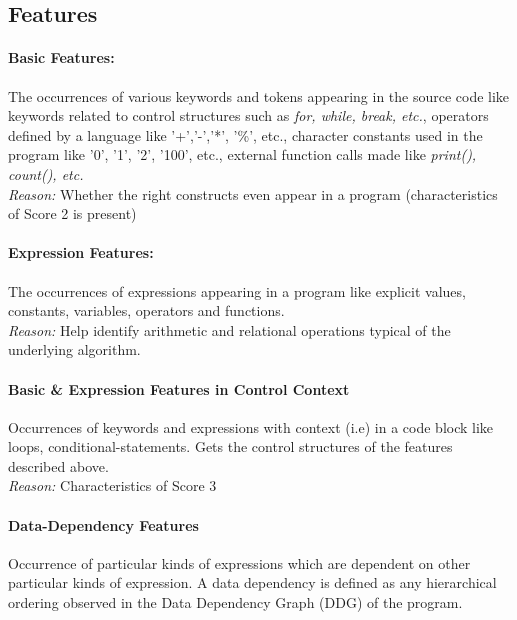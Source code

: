 \documentclass{article}
\begin{document}
\subsection{Features}

\paragraph{Basic Features:}
    The occurrences of various keywords and tokens
appearing in the source code like keywords related to control structures such as \textit{for, while, break, etc.}, operators defined by a language like '+','-','*', '\%', etc., character constants used in the program like '0', '1', '2', '100', etc., external function calls made like\textit{ print(), count(), etc.}\\

\textit{Reason:} Whether the right constructs even appear in a program (characteristics of Score 2 is present)

\paragraph{Expression Features:}
   The occurrences of expressions appearing in a program like explicit values, constants, variables, operators and functions.\\

\textit{Reason:} Help identify arithmetic and relational operations typical of the underlying algorithm.

\paragraph{Basic \& Expression Features in Control Context}
Occurrences of keywords and expressions with context (i.e) in a code block like loops, conditional-statements. Gets the control structures of the features described above.\\

\textit{Reason:} Characteristics of Score 3 

\paragraph{Data-Dependency Features}
Occurrence of particular kinds of expressions which are dependent on other particular kinds of expression. A data dependency is defined as any hierarchical ordering observed in the Data Dependency Graph (DDG) of the program.\\
\end{document}

